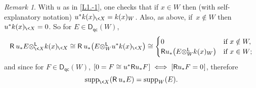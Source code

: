 \documentclass{compositio}
\theoremstyle{plain}
\theoremstyle{definition}
\theoremstyle{remark}
\newtheorem{subrem}[equation]{Remark}
\numberwithin{equation}{thm}
\begin{document}
\begin{subrem}\label{supp u_*} With $u$ as in \ref{L1.-1}, one checks that if $x\in W$ then 
(with self-explanatory notation)  $u^*k(x)_{{{\mkern-1mu}\<X}}=k(x)_W$.
Also, as above, if~$x\notin W$ then
$u^*k(x)_{{{\mkern-1mu}\<X}}=0$. So for $E\in{{\boldsymbol{\mathsf{D}}}_{\mathsf{qc}}}(W)$,
\[
{\mathsf R}\>u_*E{\otimes^{\mathsf L}_{{{\mkern-1mu}\<X}}}k(x)_{{{\mkern-1mu}\<X}} \cong {\mathsf R}\>u_*\big(E{\otimes^{\mathsf L}_{{W}}} u^*k(x)_{{{\mkern-1mu}\<X}}\big) \cong
\begin{cases}
 0  & \text{if $x\notin W,$} \\
{\mathsf R} u_*\big(E{\otimes^{\mathsf L}_{{W}}} k(x)_W\big) & \text{if $x\in W;$}
\end{cases}
\]
and since for $F\in{{\boldsymbol{\mathsf{D}}}_{\mathsf{qc}}}(W)$,  
$[0=F\cong u^*{\mathsf R} u_*F{\mkern1mu}]\iff [{\mathsf R} u_*F=0{\mkern1mu}]$, therefore
\[
\operatorname{supp}_{{{\mkern-1mu}\<X}}({\mathsf R}\>u_*E)=\operatorname{supp}_W(E). \\[4pt]
\]

\end{subrem}

\pagebreak
\end{document}
